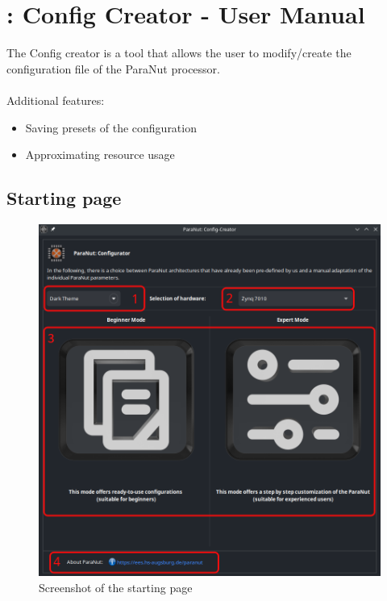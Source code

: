 \section{\paranut: Config Creator - User Manual}

The Config creator is a tool that allows the user to modify/create the configuration
file of the ParaNut processor.\\\\
Additional features:
\begin{itemize}
	\item Saving presets of the configuration
	\item Approximating resource usage
\end{itemize}

\subsection{Starting page}

\begin{figure}[!h]
    \noindent \begin{centering}
        \includegraphics[width=15cm]{images/pn_config_creator_start_page}
        \par\end{centering}
    \caption{Screenshot of the starting page}
\end{figure}

